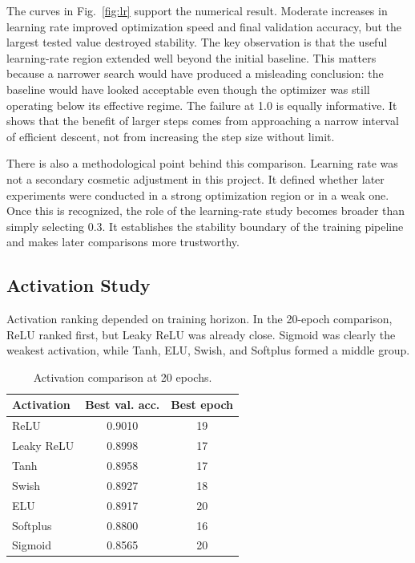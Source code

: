 \documentclass[10pt,twocolumn]{article}
\begin{document}
The curves in Fig.~\ref{fig:lr} support the numerical result. Moderate increases in learning rate improved optimization speed and final validation accuracy, but the largest tested value destroyed stability. The key observation is that the useful learning-rate region extended well beyond the initial baseline. This matters because a narrower search would have produced a misleading conclusion: the baseline would have looked acceptable even though the optimizer was still operating below its effective regime. The failure at 1.0 is equally informative. It shows that the benefit of larger steps comes from approaching a narrow interval of efficient descent, not from increasing the step size without limit.

There is also a methodological point behind this comparison. Learning rate was not a secondary cosmetic adjustment in this project. It defined whether later experiments were conducted in a strong optimization region or in a weak one. Once this is recognized, the role of the learning-rate study becomes broader than simply selecting 0.3. It establishes the stability boundary of the training pipeline and makes later comparisons more trustworthy.

\subsection{Activation Study}
Activation ranking depended on training horizon. In the 20-epoch comparison, ReLU ranked first, but Leaky ReLU was already close. Sigmoid was clearly the weakest activation, while Tanh, ELU, Swish, and Softplus formed a middle group.

\begin{table}[H]
\centering
\caption{Activation comparison at 20 epochs.}
\label{tab:act_short}
\begin{tabular}{lcc}
\toprule
Activation & Best val. acc. & Best epoch \\
\midrule
ReLU & 0.9010 & 19 \\
Leaky ReLU & 0.8998 & 17 \\
Tanh & 0.8958 & 17 \\
Swish & 0.8927 & 18 \\
ELU & 0.8917 & 20 \\
Softplus & 0.8800 & 16 \\
Sigmoid & 0.8565 & 20 \\
\bottomrule
\end{tabular}
\end{table}
\end{document}
